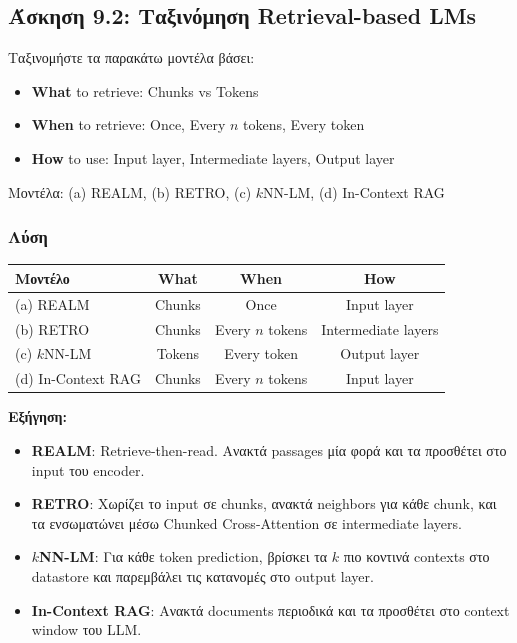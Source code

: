 \subsection{Άσκηση 9.2: Ταξινόμηση Retrieval-based LMs}

\begin{formulabox}[Εκφώνηση]
Ταξινομήστε τα παρακάτω μοντέλα βάσει:
\begin{itemize}
    \item \textbf{What} to retrieve: Chunks vs Tokens
    \item \textbf{When} to retrieve: Once, Every $n$ tokens, Every token
    \item \textbf{How} to use: Input layer, Intermediate layers, Output layer
\end{itemize}

Μοντέλα: (a) REALM, (b) RETRO, (c) $k$NN-LM, (d) In-Context RAG
\end{formulabox}

\subsubsection*{Λύση}

\begin{center}
\begin{tabular}{lccc}
\toprule
\textbf{Μοντέλο} & \textbf{What} & \textbf{When} & \textbf{How} \\
\midrule
(a) REALM & Chunks & Once & Input layer \\
(b) RETRO & Chunks & Every $n$ tokens & Intermediate layers \\
(c) $k$NN-LM & Tokens & Every token & Output layer \\
(d) In-Context RAG & Chunks & Every $n$ tokens & Input layer \\
\bottomrule
\end{tabular}
\end{center}

\textbf{Εξήγηση:}

\begin{itemize}
    \item \textbf{REALM}: Retrieve-then-read. Ανακτά passages μία φορά και τα
    προσθέτει στο input του encoder.

    \item \textbf{RETRO}: Χωρίζει το input σε chunks, ανακτά neighbors για κάθε
    chunk, και τα ενσωματώνει μέσω Chunked Cross-Attention σε intermediate layers.

    \item \textbf{$k$NN-LM}: Για κάθε token prediction, βρίσκει τα $k$ πιο κοντινά
    contexts στο datastore και παρεμβάλει τις κατανομές στο output layer.

    \item \textbf{In-Context RAG}: Ανακτά documents περιοδικά και τα προσθέτει
    στο context window του LLM.
\end{itemize}

